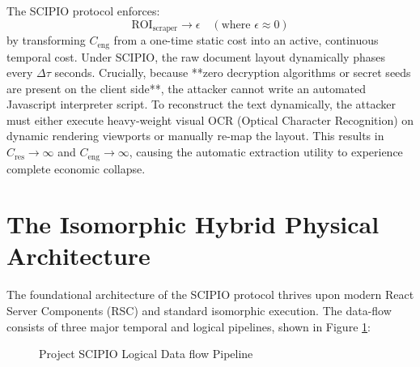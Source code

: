 \documentclass[10pt,journal,compsoc]{IEEEtran}
\begin{document}
The SCIPIO protocol enforces:
\begin{equation}
    \text{ROI}_{\text{scraper}} \to \epsilon \quad (\text{where } \epsilon \approx 0)
\end{equation}
by transforming $C_{\text{eng}}$ from a one-time static cost into an active, continuous temporal cost. Under SCIPIO, the raw document layout dynamically phases every $\Delta \tau$ seconds. Crucially, because **zero decryption algorithms or secret seeds are present on the client side**, the attacker cannot write an automated Javascript interpreter script. To reconstruct the text dynamically, the attacker must either execute heavy-weight visual OCR (Optical Character Recognition) on dynamic rendering viewports or manually re-map the layout. This results in $C_{\text{res}} \to \infty$ and $C_{\text{eng}} \to \infty$, causing the automatic extraction utility to experience complete economic collapse.

\newpage
\section{The Isomorphic Hybrid Physical Architecture}
The foundational architecture of the SCIPIO protocol thrives upon modern React Server Components (RSC) and standard isomorphic execution. The data-flow consists of three major temporal and logical pipelines, shown in Figure \ref{fig:flow}:

\begin{figure}[htbp]
    \centering
    \caption{Project SCIPIO Logical Data flow Pipeline}
    \label{fig:flow}
\end{figure}
\end{document}
